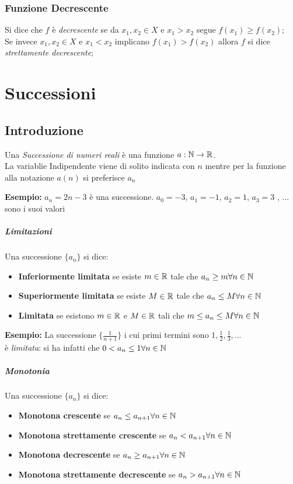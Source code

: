 \documentclass[12pt, a4paper, openany]{book}
\newcommand{\esempio}[1]{\begin{box_esempio} \textbf{Esempio: }#1\end{box_esempio}}
\newcommand{\definizione}[1]{\begin{box_definizione} #1 \end{box_definizione}}
\begin{document}
\subsection*{Funzione Decrescente}
Si dice che $f$ è \emph{decrescente} se da $x_1, x_2 \in X$ e $x_1 > x_2$ segue $f(x_1) \geq f(x_2)$;
\\Se invece $x_1, x_2 \in X$ e $x_1 < x_2$ implicano $f(x_1) > f(x_2)$ allora $f$ si dice \emph{strettamente decrescente};


\chapter{Successioni}

\section{Introduzione}
\definizione{
    Una \emph{Successione di numeri reali} è una funzione $a: \mathbb{N} \to \mathbb{R}$.\\
    La variablie Indipendente viene di solito indicata con $n$ mentre per la funzione alla notazione $a(n)$ si preferisce $a_n$    
} 
\esempio{
    $a_n = 2n-3$ è una successione.
    $a_0 = -3$, $a_1 = -1$, $a_2 = 1$, $a_3 = 3$ , ... sono i suoi valori
}

\paragraph*{Limitazioni} Una successione $\{a_n\}$ si dice:
\begin{itemize}
    \item \textbf{Inferiormente limitata} se esiste $m \in \mathbb{R}$ tale che $a_n \geq m \forall n \in \mathbb{N}$
    \item \textbf{Superiormente limitata} se esiste $M \in \mathbb{R}$ tale che $a_n \leq M \forall n \in \mathbb{N}$
    \item \textbf{Limitata} se esistono $m \in \mathbb{R}$ e $M \in \mathbb{R}$ tali che $m \leq a_n \leq M \forall n \in \mathbb{N}$
\end{itemize}
\esempio{
    La successione $\{\frac{1}{n+1}\}$ i cui primi termini sono $1, \frac{1}{2}, \frac{1}{3},$...\\
    è \emph{limitata}: si ha infatti che $0 < a_n \leq 1 \forall n \in \mathbb{N}$
}

\paragraph*{Monotonia} Una successione $\{a_n\}$ si dice:
\begin{itemize}
    \item \textbf{Monotona crescente} se $a_n\leq a_{n+1} \forall n \in \mathbb{N}$
    \item \textbf{Monotona strettamente crescente} se $a_n < a_{n+1} \forall n \in \mathbb{N}$
    \item \textbf{Monotona decrescente} se $a_n \geq a_{n+1} \forall n\in\mathbb{N}$
    \item \textbf{Monotona strettamente decrescente} se $a_n > a_{n+1} \forall n \in \mathbb{N}$
\end{itemize}
\end{document}
